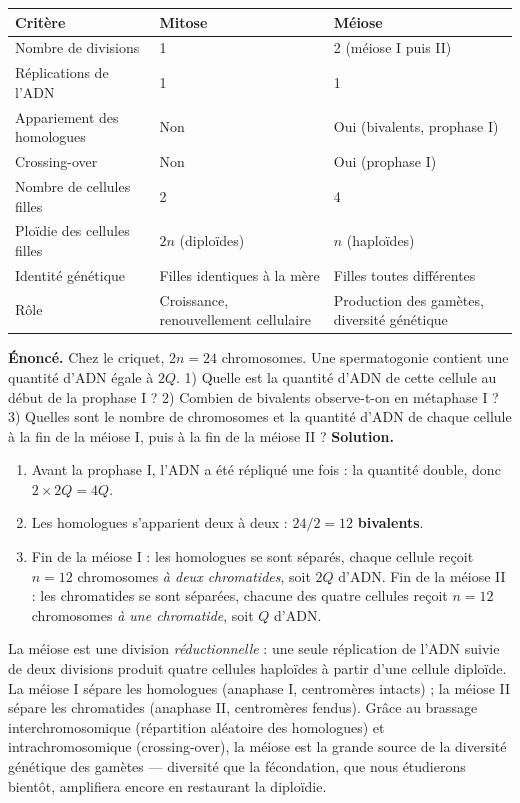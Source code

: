 \documentclass[11pt]{article}
\begin{document}
\begin{center}
\begin{tabularx}{\linewidth}{|l|X|X|}
\hline
\rowcolor{popblueL} \textbf{Critère} & \textbf{Mitose} & \textbf{Méiose} \\
\hline
Nombre de divisions & 1 & 2 (méiose I puis II) \\
\hline
Réplications de l'ADN & 1 & 1 \\
\hline
Appariement des homologues & Non & Oui (bivalents, prophase I) \\
\hline
Crossing-over & Non & Oui (prophase I) \\
\hline
Nombre de cellules filles & 2 & 4 \\
\hline
Ploïdie des cellules filles & $2n$ (diploïdes) & $n$ (haploïdes) \\
\hline
Identité génétique & Filles identiques à la mère & Filles toutes différentes \\
\hline
Rôle & Croissance, renouvellement cellulaire & Production des gamètes, diversité génétique \\
\hline
\end{tabularx}
\end{center}

\begin{exoresolu}
\textbf{Énoncé.} Chez le criquet, $2n = 24$ chromosomes. Une spermatogonie contient une quantité d'ADN égale à $2Q$. 1) Quelle est la quantité d'ADN de cette cellule au début de la prophase I ? 2) Combien de bivalents observe-t-on en métaphase I ? 3) Quelles sont le nombre de chromosomes et la quantité d'ADN de chaque cellule à la fin de la méiose I, puis à la fin de la méiose II ?
\tcblower
\textbf{Solution.}
\begin{enumerate}
\item Avant la prophase I, l'ADN a été répliqué une fois : la quantité double, donc $2 \times 2Q = 4Q$.
\item Les homologues s'apparient deux à deux : $24 / 2 = 12$ \textbf{bivalents}.
\item Fin de la méiose I : les homologues se sont séparés, chaque cellule reçoit $n = 12$ chromosomes \emph{à deux chromatides}, soit $2Q$ d'ADN. Fin de la méiose II : les chromatides se sont séparées, chacune des quatre cellules reçoit $n = 12$ chromosomes \emph{à une chromatide}, soit $Q$ d'ADN.
\end{enumerate}
\end{exoresolu}

\begin{aretenir}
La méiose est une division \emph{réductionnelle} : une seule réplication de l'ADN suivie de deux divisions produit quatre cellules haploïdes à partir d'une cellule diploïde. La méiose I sépare les homologues (anaphase I, centromères intacts) ; la méiose II sépare les chromatides (anaphase II, centromères fendus). Grâce au brassage interchromosomique (répartition aléatoire des homologues) et intrachromosomique (crossing-over), la méiose est la grande source de la diversité génétique des gamètes — diversité que la fécondation, que nous étudierons bientôt, amplifiera encore en restaurant la diploïdie.
\end{aretenir}
\end{document}
